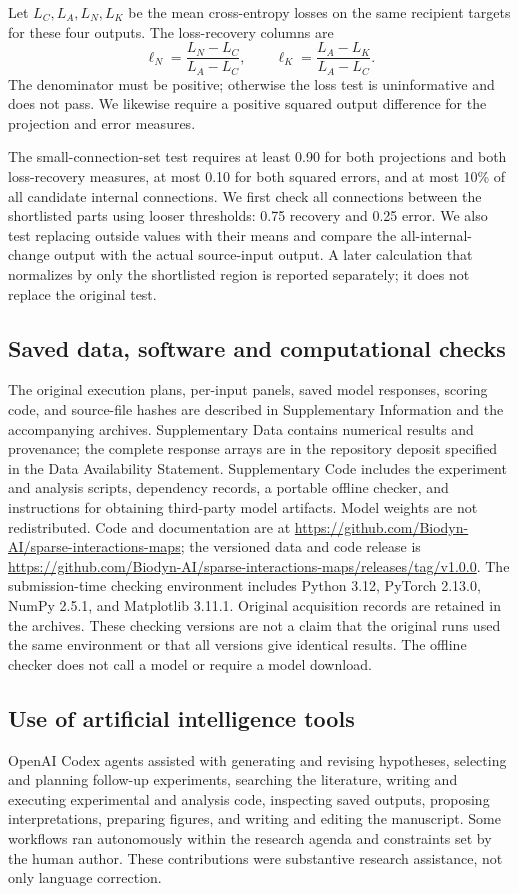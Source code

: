\documentclass[11pt,letterpaper]{article}
\begin{document}
Let $L_C,L_A,L_N,L_K$ be the mean cross-entropy losses on the same recipient
targets for these four outputs. The loss-recovery columns are
\begin{equation}
 \ell_N=\frac{L_N-L_C}{L_A-L_C},\qquad
 \ell_K=\frac{L_A-L_K}{L_A-L_C}.
\end{equation}
The denominator must be positive; otherwise the loss test is uninformative
and does not pass. We likewise require a positive squared output difference
for the projection and error measures.


The small-connection-set test requires at least 0.90 for both projections and
both loss-recovery measures, at most 0.10 for both squared errors, and at most
10\% of all candidate internal connections. We first check all connections
between the shortlisted parts using looser thresholds: 0.75 recovery and 0.25
error. We also test replacing outside values with their means and compare the
all-internal-change output with the actual source-input output. A later
calculation that normalizes by only the shortlisted region is reported
separately; it does not replace the original test.


\subsection*{Saved data, software and computational checks}
The original execution plans, per-input panels, saved model responses,
scoring code, and source-file hashes are described in Supplementary Information and the
accompanying archives. Supplementary Data contains numerical results and provenance;
the complete response arrays are in the repository deposit specified in the
Data Availability Statement. Supplementary Code includes the experiment and analysis
scripts, dependency records, a portable offline checker, and instructions for
obtaining third-party model artifacts. Model weights are not redistributed.
Code and documentation are at
\url{https://github.com/Biodyn-AI/sparse-interactions-maps};
the versioned data and code release is
\url{https://github.com/Biodyn-AI/sparse-interactions-maps/releases/tag/v1.0.0}.
The submission-time checking environment includes Python 3.12, PyTorch 2.13.0,
NumPy 2.5.1, and Matplotlib 3.11.1. Original acquisition records are retained
in the archives. These checking versions are not a claim that the original
runs used the same environment or that all versions give identical results. The offline
checker does not call a model or require a model download.

\subsection*{Use of artificial intelligence tools}
OpenAI Codex agents assisted with generating and revising hypotheses,
selecting and planning follow-up experiments, searching the literature,
writing and executing experimental and analysis code, inspecting saved
outputs, proposing interpretations, preparing figures, and writing and
editing the manuscript. Some workflows ran autonomously within the research
agenda and constraints set by the human author. These contributions were
substantive research assistance, not only language correction.
\end{document}
